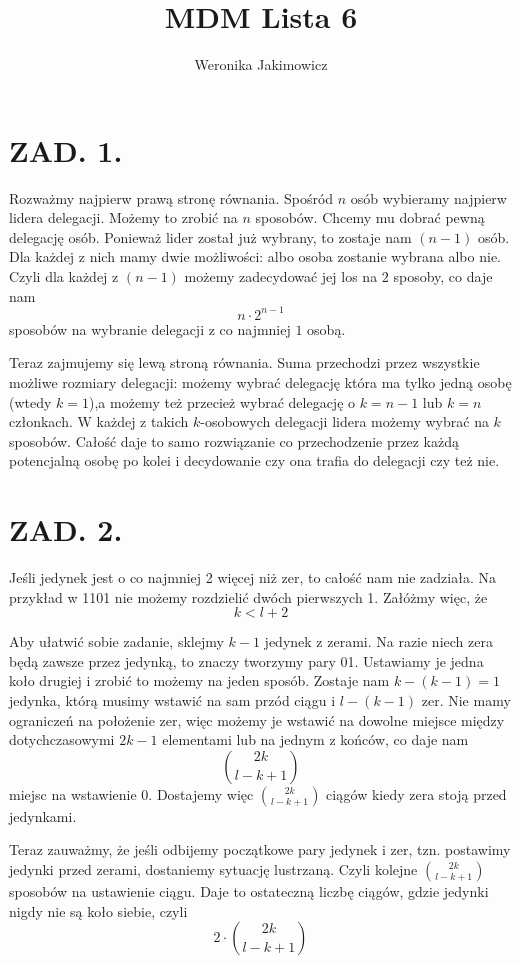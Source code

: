 \documentclass{article}[13pt]
\author{Weronika Jakimowicz}
\title{MDM Lista 6}
\date{}
\begin{document}
\maketitle

\section*{ZAD. 1.}

Rozważmy najpierw prawą stronę równania. Spośród $n$ osób wybieramy najpierw lidera delegacji. Możemy to zrobić na $n$ sposobów. Chcemy mu dobrać pewną delegację osób. Ponieważ lider został już wybrany, to zostaje nam $(n-1)$ osób. Dla każdej z nich mamy dwie możliwości: albo osoba zostanie wybrana albo nie. Czyli dla każdej z $(n-1)$ możemy zadecydować jej los na $2$ sposoby, co daje nam
$$n\cdot 2^{n-1}$$
sposobów na wybranie delegacji z co najmniej $1$ osobą.
\medskip

Teraz zajmujemy się lewą stroną równania. Suma przechodzi przez wszystkie możliwe rozmiary delegacji: możemy wybrać delegację która ma tylko jedną osobę (wtedy $k=1$),a możemy też przecież wybrać delegację o $k=n-1$ lub $k=n$ członkach. W każdej z takich $k$-osobowych delegacji lidera możemy wybrać na $k$ sposobów. Całość daje to samo rozwiązanie co przechodzenie przez każdą potencjalną osobę po kolei i decydowanie czy ona trafia do delegacji czy też nie.

\section*{ZAD. 2.}

Jeśli jedynek jest o co najmniej 2 więcej niż zer, to całość nam nie zadziała. Na przykład w 1101 nie możemy rozdzielić dwóch pierwszych 1. Załóżmy więc, że
$$k<l+2$$

Aby ułatwić sobie zadanie, sklejmy $k-1$ jedynek z zerami. Na razie niech zera będą zawsze przez jedynką, to znaczy tworzymy pary 01. Ustawiamy je jedna koło drugiej i zrobić to możemy na jeden sposób. Zostaje nam $k-(k-1)=1$ jedynka, którą musimy wstawić na sam przód ciągu i $l-(k-1)$ zer. Nie mamy ograniczeń na położenie zer, więc możemy je wstawić na dowolne miejsce między dotychczasowymi $2k-1$ elementami lub na jednym z końców, co daje nam
$${2k\choose l-k+1}$$
miejsc na wstawienie 0. Dostajemy więc ${2k\choose l-k+1}$ ciągów kiedy zera stoją przed jedynkami.
\smallskip

Teraz zauważmy, że jeśli odbijemy początkowe pary jedynek i zer, tzn. postawimy jedynki przed zerami, dostaniemy sytuację lustrzaną. Czyli kolejne ${2k\choose l-k+1}$ sposobów na ustawienie ciągu. Daje to ostateczną liczbę ciągów, gdzie jedynki nigdy nie są koło siebie, czyli
$$2\cdot {2k\choose l-k+1}$$
\end{document}
